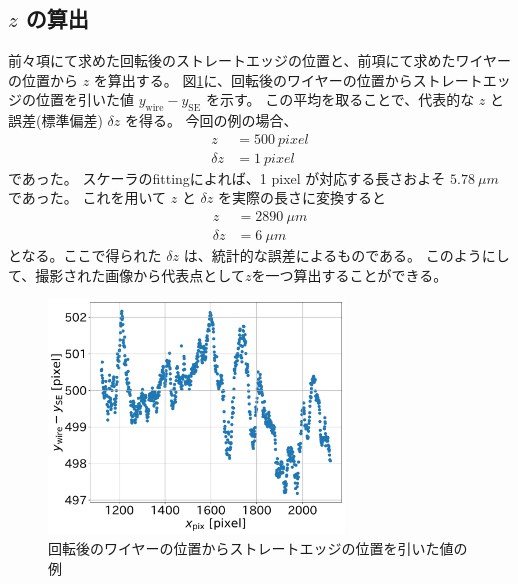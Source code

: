 \documentclass[../../main.tex]{subfiles}
\begin{document}
\subsection{$z$ の算出}
前々項にて求めた回転後のストレートエッジの位置と、前項にて求めたワイヤーの位置から $z$ を算出する。
図\ref{fig:wiresag_wire_se_positions_diff}に、回転後のワイヤーの位置からストレートエッジの位置を引いた値 $y_{\mathrm{wire}}-y_{\mathrm{SE}}$ を示す。
この平均を取ることで、代表的な $z$ と誤差(標準偏差) $\delta z$ を得る。
今回の例の場合、
\begin{align}
    z &= \SI{500}{pixel} \\
    \delta z &= \SI{1}{pixel}
\end{align}
であった。
スケーラのfittingによれば、1 pixel が対応する長さおよそ $\SI{5.78}{\mu m}$ であった。
これを用いて $z$ と $\delta z$ を実際の長さに変換すると
\begin{align}
    z &= \SI{2890}{\mu m} \\
    \delta z &= \SI{6}{\mu m}
\end{align}
となる。ここで得られた $\delta z$ は、統計的な誤差によるものである。
このようにして、撮影された画像から代表点として$z$を一つ算出することができる。
\begin{figure}[H]
    \centering
    \includegraphics[width=0.7\textwidth]{wiresag/wiresag_wire_se_positions_diff.pdf}
    \caption{回転後のワイヤーの位置からストレートエッジの位置を引いた値の例}
    \label{fig:wiresag_wire_se_positions_diff}    
\end{figure}
\end{document}
